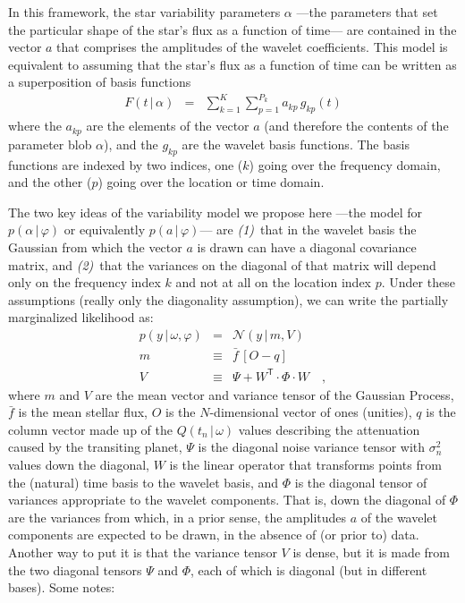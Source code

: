 \documentclass[12pt,letterpaper]{article}
\newcommand{\given}{\,|\,}
\newcommand{\transpose}[1]{{#1}^{\mathsf{T}}}
\newcommand{\datavec}{y}
\newcommand{\exofn}{Q}
\newcommand{\exovec}{q}
\newcommand{\exopars}{\omega}
\newcommand{\flux}{F}
\newcommand{\meanflux}{\bar{f}}
\newcommand{\lcpars}{\alpha}
\newcommand{\variance}{\sigma^2}
\newcommand{\hyperpars}{\varphi}
\newcommand{\normal}{{\mathcal N}}
\newcommand{\meanvec}{m}
\newcommand{\wavevec}{a}
\newcommand{\noisetensor}{\Psi}
\newcommand{\wavetensor}{\Phi}
\newcommand{\weightmatrix}{W}
\newcommand{\vartensor}{V}
\newcommand{\basisfunction}{g}
\newcommand{\onevec}{O}
\begin{document}
In this framework, the star variability parameters $\lcpars$%
---the parameters that set the particular shape of the star's flux as a function of time---%
are contained in the vector $\wavevec$ that comprises the amplitudes of the wavelet coefficients.
This model is equivalent to assuming that the star's flux as a function of time
can be written as a superposition of basis functions
\begin{eqnarray}
\flux(t\given\lcpars) &=& \sum_{k=1}^K \sum_{p=1}^{P_k} \wavevec_{kp}\,\basisfunction_{kp}(t)
\end{eqnarray}
where
the $\wavevec_{kp}$ are the elements of the vector $\wavevec$
(and therefore the contents of the parameter blob $\lcpars$),
and the $\basisfunction_{kp}$ are the wavelet basis functions.
The basis functions are indexed by two indices,
one ($k$) going over the frequency domain,
and the other ($p$) going over the location or time domain.

The two key ideas of the variability model we propose here%
---the model for $p(\lcpars\given\hyperpars)$ or equivalently $p(\wavevec\given\hyperpars)$---%
are \textsl{(1)}~that in the wavelet basis the Gaussian from which the vector $\wavevec$ is drawn
can have a diagonal covariance matrix,
and \textsl{(2)}~that the variances on the diagonal of that matrix will depend only on the
frequency index $k$ and not at all on the location index $p$.
Under these assumptions (really only the diagonality assumption),
we can write the partially marginalized likelihood as:
\begin{eqnarray}
p(\datavec\given\exopars,\hyperpars)
  &=& \normal(\datavec\given\meanvec,\vartensor)
\label{eq:wavelike}
\\
\meanvec
  &\equiv& \meanflux\,[\onevec - \exovec]
\\
\vartensor
  &\equiv& \noisetensor + \transpose{\weightmatrix}\cdot\wavetensor\cdot{\weightmatrix}
\label{eq:variance}
\quad ,
\end{eqnarray}
where
$\meanvec$ and $\vartensor$ are the mean vector and variance tensor of the Gaussian Process,
$\meanflux$ is the mean stellar flux,
$\onevec$ is the $N$-dimensional vector of ones (unities),
$\exovec$ is the column vector made up of the $\exofn(t_n\given\exopars)$ values
describing the attenuation caused by the transiting planet,
$\noisetensor$ is the diagonal noise variance tensor with $\variance_n$ values down the diagonal,
$\weightmatrix$ is the linear operator that transforms points
from the (natural) time basis to the wavelet basis,
and $\wavetensor$ is the diagonal tensor of variances appropriate to the wavelet components.
That is, down the diagonal of $\wavetensor$ are the variances from which,
in a prior sense,
the amplitudes $\wavevec$ of the wavelet components are expected to be drawn,
in the absence of (or prior to) data.
Another way to put it is that the variance tensor $\vartensor$ is dense,
but it is made from the two diagonal tensors $\noisetensor$ and $\wavetensor$,
each of which is diagonal (but in different bases).  Some notes:
\end{document}
